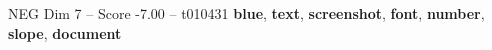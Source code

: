 \begin{textsample}{NEG Dim 7 – Score -7.00 – t010431}  \label{ex:f7_neg_020}
\textbf{blue}, \textbf{text}, \textbf{screenshot}, \textbf{font}, \textbf{number}, \textbf{slope}, \textbf{document}

\end{textsample}
